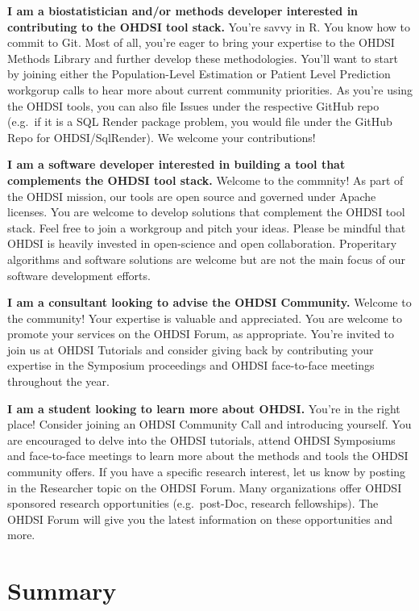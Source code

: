 \documentclass[11pt]{book}
\theoremstyle{definition}
\theoremstyle{definition}
\theoremstyle{definition}
\theoremstyle{remark}
\begin{document}
\textbf{I am a biostatistician and/or methods developer interested in contributing to the OHDSI tool stack.} You're savvy in R. You know how to commit to Git. Most of all, you're eager to bring your expertise to the OHDSI Methods Library and further develop these methodologies. You'll want to start by joining either the Population-Level Estimation or Patient Level Prediction workgorup calls to hear more about current community priorities. As you're using the OHDSI tools, you can also file Issues under the respective GitHub repo (e.g.~if it is a SQL Render package problem, you would file under the GitHub Repo for OHDSI/SqlRender). We welcome your contributions!

\textbf{I am a software developer interested in building a tool that complements the OHDSI tool stack.} Welcome to the commnity! As part of the OHDSI mission, our tools are open source and governed under Apache licenses. You are welcome to develop solutions that complement the OHDSI tool stack. Feel free to join a workgroup and pitch your ideas. Please be mindful that OHDSI is heavily invested in open-science and open collaboration. Properitary algorithms and software solutions are welcome but are not the main focus of our software development efforts.

\textbf{I am a consultant looking to advise the OHDSI Community.} Welcome to the community! Your expertise is valuable and appreciated. You are welcome to promote your services on the OHDSI Forum, as appropriate. You're invited to join us at OHDSI Tutorials and consider giving back by contributing your expertise in the Symposium proceedings and OHDSI face-to-face meetings throughout the year.

\textbf{I am a student looking to learn more about OHDSI.} You're in the right place! Consider joining an OHDSI Community Call and introducing yourself. You are encouraged to delve into the OHDSI tutorials, attend OHDSI Symposiums and face-to-face meetings to learn more about the methods and tools the OHDSI community offers. If you have a specific research interest, let us know by posting in the Researcher topic on the OHDSI Forum. Many organizations offer OHDSI sponsored research opportunities (e.g.~post-Doc, research fellowships). The OHDSI Forum will give you the latest information on these opportunities and more.

\hypertarget{summary-1}{%
\section{Summary}\label{summary-1}}
\end{document}
